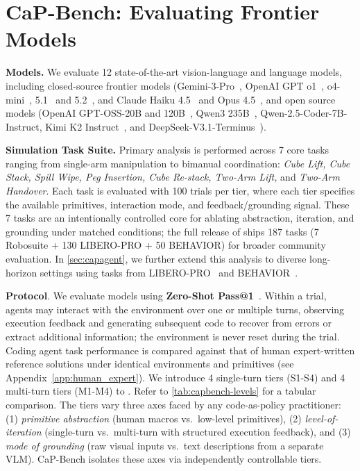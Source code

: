 \section{CaP-Bench: Evaluating Frontier Models}






\textbf{Models.} We evaluate 12 state-of-the-art vision-language and language models, including closed-source frontier models (Gemini-3-Pro~\cite{google_deepmind_gemini3pro_modelcard_2025}, OpenAI GPT o1~\cite{openai_o1_system_card_2024}, o4-mini~\cite{openai_o4mini_system_card_2025}, 5.1~\cite{openai_gpt5_1_2025} and 5.2~\cite{openai_gpt5_2_2025}, and Claude Haiku 4.5~\cite{anthropic_claude_haiku_4_5_2025} and Opus 4.5~\cite{anthropic_claude_opus_4_5_2025}, and open source models (OpenAI GPT-OSS-20B and 120B~\cite{openai_gpt_oss_120b_2025}, Qwen3 235B~\cite{qwen_qwen3_235b_2025}, Qwen-2.5-Coder-7B-Instruct, Kimi K2 Instruct~\cite{moonshot_ai_2025}, and DeepSeek-V3.1-Terminus~\cite{deepseekai2024deepseekv3technicalreport}). 

\textbf{Simulation Task Suite.} Primary analysis is performed across 7 core tasks ranging from single-arm manipulation to bimanual coordination: \textit{Cube Lift, Cube Stack, Spill Wipe, Peg Insertion, Cube Re-stack, Two-Arm Lift,} and \textit{Two-Arm Handover}. Each task is evaluated with 100 trials per tier, where each tier specifies the available primitives, interaction mode, and feedback/grounding signal. These 7 tasks are an intentionally controlled core for ablating abstraction, iteration, and grounding under matched conditions; the full release of \gymname{} ships 187 tasks (7 Robosuite + 130 LIBERO-PRO + 50 BEHAVIOR) for broader community evaluation. In \cref{sec:capagent}, we further extend this analysis to diverse long-horizon settings using tasks from LIBERO-PRO~\cite{zhou2025liberopro} and BEHAVIOR~\cite{li2024behavior1k}.

\textbf{Protocol}. We evaluate models using \textbf{Zero-Shot Pass@1}~\citep{chen2021codex,jimenez2024swebench}. Within a trial, agents may interact with the environment over one or multiple turns, observing execution feedback and generating subsequent code to recover from errors or extract additional information; the environment is never reset during the trial. Coding agent task performance is compared against that of human expert-written reference solutions under identical environments and primitives (see Appendix~\ref{app:human_expert}).
We introduce 4 single-turn tiers (S1-S4) and 4 multi-turn tiers (M1-M4) to \benchname{}. Refer to \cref{tab:capbench-levels} for a tabular comparison. The tiers vary three axes faced by any code-as-policy practitioner: (1) \textit{primitive abstraction} (human macros vs.\ low-level primitives), (2) \textit{level-of-iteration} (single-turn vs.\ multi-turn with structured execution feedback), and (3) \textit{mode of grounding} (raw visual inputs vs.\ text descriptions from a separate VLM). CaP-Bench isolates these axes via independently controllable tiers.






